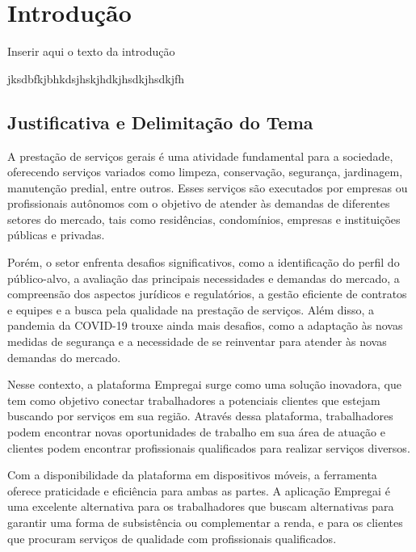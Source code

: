 \chapter{Introdução}

Inserir aqui o texto da introdução

jksdbfkjbhkdsjhskjhdkjhsdkjhsdkjfh

\section{Justificativa e Delimitação do Tema}

A prestação de serviços gerais é uma atividade fundamental para a sociedade, oferecendo serviços variados como limpeza, conservação, segurança, jardinagem, manutenção predial, entre outros. Esses serviços são executados por empresas ou profissionais autônomos com o objetivo de atender às demandas de diferentes setores do mercado, tais como residências, condomínios, empresas e instituições públicas e privadas.

Porém, o setor enfrenta desafios significativos, como a identificação do perfil do público-alvo, a avaliação das principais necessidades e demandas do mercado, a compreensão dos aspectos jurídicos e regulatórios, a gestão eficiente de contratos e equipes e a busca pela qualidade na prestação de serviços. Além disso, a pandemia da COVID-19 trouxe ainda mais desafios, como a adaptação às novas medidas de segurança e a necessidade de se reinventar para atender às novas demandas do mercado.

Nesse contexto, a plataforma Empregai surge como uma solução inovadora, que tem como objetivo conectar trabalhadores a potenciais clientes que estejam buscando por serviços em sua região. Através dessa plataforma, trabalhadores podem encontrar novas oportunidades de trabalho em sua área de atuação e clientes podem encontrar profissionais qualificados para realizar serviços diversos.

Com a disponibilidade da plataforma em dispositivos móveis, a ferramenta oferece praticidade e eficiência para ambas as partes. A aplicação Empregai é uma excelente alternativa para os trabalhadores que buscam alternativas para garantir uma forma de subsistência ou complementar a renda, e para os clientes que procuram serviços de qualidade com profissionais qualificados.

